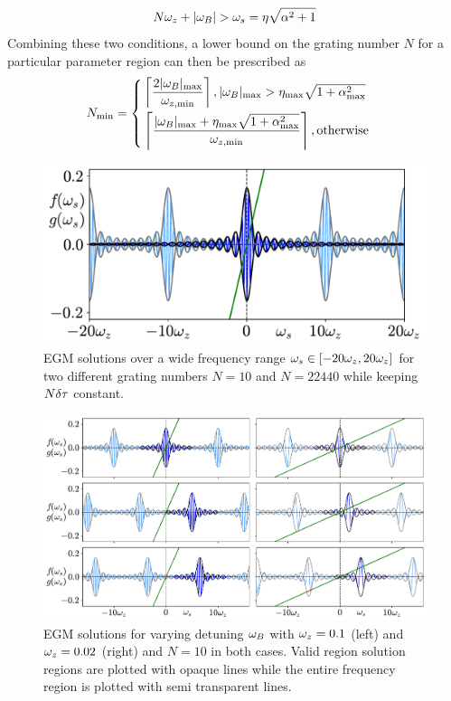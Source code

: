%
\begin{equation*}
    N \omega_z + |\omega_B| > \omega_s = \eta \sqrt{\alpha^2+1}
\end{equation*}
%
Combining these two conditions, a lower bound on the grating number $N$ for a particular parameter region can then be prescribed as
%
\begin{equation}
    \label{eq:Nmin}
    N_\text{min} = 
    \begin{cases}
        \left\lceil \dfrac{2|\omega_B|_{\max}}{\omega_{z,\min}} \right\rceil, |\omega_B|_{\max} > \eta_{\max} \sqrt{1+\alpha_{\max}^2} \\[2ex]
        \left\lceil \dfrac{|\omega_B|_{\max} + \eta_{\max} \sqrt{1+\alpha_{\max}^2}}{\omega_{z,\min}} \right\rceil, \text{otherwise}
    \end{cases}
\end{equation}
%
\begin{figure}[!t]
    \centering
    
    \includegraphics[width=\linewidth]{Images/discretised_EGM_wideview.pdf}
    
    \caption{EGM solutions over a wide frequency range $\omega_s \in [-20\omega_z, 20\omega_z]$ for two different grating numbers $N = 10$ and $N = 22440$ while keeping $N\delta \tau$ constant.}
    
    \label{fig:discretised_EGM_wide_view}
\end{figure}
%
\begin{figure}[!t]
    \flushleft
    \hspace{0.5em}
    \includegraphics[width=0.87\linewidth]{Images/discretised_EGM_minimumN.pdf}
    
    \caption{EGM solutions for varying detuning $\omega_B$ with $\omega_z=0.1$ (left) and $\omega_z=0.02$ (right) and $N=10$ in both cases. 
    Valid region solution regions are plotted with opaque lines while the entire frequency region is plotted with semi transparent lines.}
    
    \label{fig:discretised_EGM_minimumN}
\end{figure}
